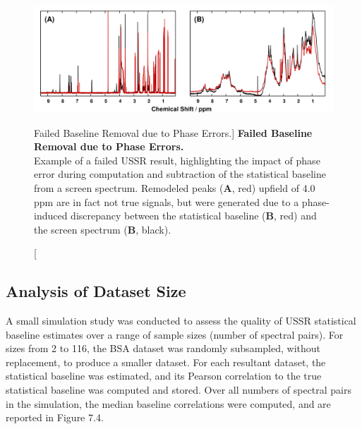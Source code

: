 \begin{figure}[ht!]
\includegraphics[width=6.5in]{figs/ussr/03-ussrfail.png}
\caption
      [Failed Baseline Removal due to Phase Errors.]{
  {\bf Failed Baseline Removal due to Phase Errors.}
  \\
  Example of a failed USSR result, highlighting the impact of phase error
  during computation and subtraction of the statistical baseline from a screen
  spectrum. Remodeled peaks ({\bf A}, red) upfield of 4.0 ppm are in fact not
  true signals, but were generated due to a phase-induced discrepancy between
  the statistical baseline ({\bf B}, red) and the screen spectrum
  ({\bf B}, black).
}
\end{figure}

\subsection{Analysis of Dataset Size}

\begin{doublespace}
A small simulation study was conducted to assess the quality of USSR
statistical baseline estimates over a range of sample sizes (number of spectral
pairs). For sizes from 2 to 116, the BSA dataset was randomly subsampled,
without replacement, to produce a smaller dataset. For each resultant dataset,
the statistical baseline was estimated, and its Pearson correlation to the true
statistical baseline was computed and stored. Over all numbers of spectral
pairs in the simulation, the median baseline correlations were computed, and
are reported in Figure 7.4.
\end{doublespace}

